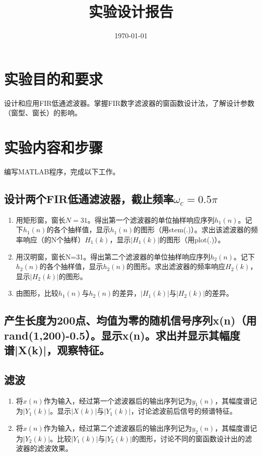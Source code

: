 \documentclass{../source/zjureport}
\title{实验设计报告}
\date{\today}
\begin{document}
    \makeheader

    \section{实验目的和要求}
    设计和应用FIR低通滤波器。掌握FIR数字滤波器的窗函数设计法，了解设计参数（窗型、窗长）的影响。

    \section{实验内容和步骤}
    编写MATLAB程序，完成以下工作。
        \subsection{设计两个FIR低通滤波器，截止频率$\omega_c = 0.5\pi$}
            \begin{enumerate}
                \item 用矩形窗，窗长$N=31$。得出第一个滤波器的单位抽样响应序列$h_1(n)$。记下$h_1(n)$的各个抽样值，显示$h_1(n)$的图形（用stem(.)）。求出该滤波器的频率响应（的N个抽样）$H_1(k)$，显示$|H_1(k)|$的图形（用plot(.)）。
                \item 用汉明窗，窗长N=31。得出第二个滤波器的单位抽样响应序列$h_2(n)$。记下$h_2(n)$的各个抽样值，显示$h_2(n)$的图形。求出滤波器的频率响应$H_2(k)$，显示$|H_2(k)|$的图形。
                \item 由图形，比较$h_1(n)$与$h_2(n)$的差异，$|H_1(k)|$与$|H_2(k)|$的差异。
            \end{enumerate}
        \subsection{产生长度为200点、均值为零的随机信号序列x(n)（用rand(1,200)-0.5）。显示x(n)。求出并显示其幅度谱|X(k)|，观察特征。}
        \subsection{滤波}
            \begin{enumerate}
                \item 将$x(n)$作为输入，经过第一个滤波器后的输出序列记为$y_1(n)$，其幅度谱记为$|Y_1(k)|$。显示$|X(k)|$与$|Y_1(k)|$，讨论滤波前后信号的频谱特征。
                \item 将$x(n)$作为输入，经过第二个滤波器后的输出序列记为$y_2(n)$，其幅度谱记为$|Y_2(k)|$。比较$|Y_1(k)|$与$|Y_2(k)|$的图形，讨论不同的窗函数设计出的滤波器的滤波效果。
            \end{enumerate}
\end{document}
